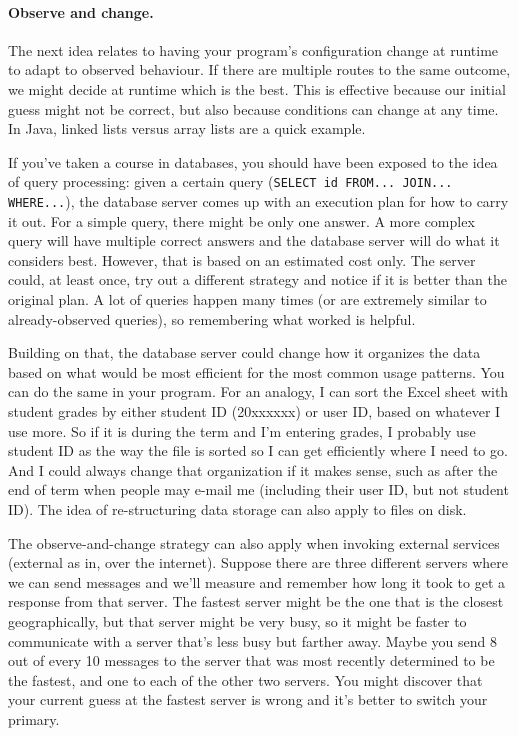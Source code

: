 \documentclass[a4paper]{report}
\begin{document}
\paragraph{Observe and change.}
The next idea relates to having your program's configuration change at runtime to adapt to observed behaviour. If there are multiple routes to the same outcome, we might decide at runtime which is the best. This is effective because our initial guess might not be correct, but also because conditions can change at any time. In Java, linked lists versus array lists are a quick example.

If you've taken a course in databases, you should have been exposed to the idea of query processing: given a certain query (\texttt{SELECT id FROM... JOIN... WHERE...}), the database server comes up with an execution plan for how to carry it out. For a simple query, there might be only one answer. A more complex query will have multiple correct answers and the database server will do what it considers best. However, that is based on an estimated cost only. The server could, at least once, try out a different strategy and notice if it is better than the original plan. A lot of queries happen many times (or are extremely similar to already-observed queries), so remembering what worked is helpful.

Building on that, the database server could change how it organizes the data based on what would be most efficient for the most common usage patterns. You can do the same in your program. For an analogy, I can sort the Excel sheet with student grades by either student ID (20xxxxxx) or user ID, based on whatever I use more. So if it is during the term and I'm entering grades, I probably use student ID as the way the file is sorted so I can get efficiently where I need to go. And I could always change that organization if it makes sense, such as after the end of term when people may e-mail me (including their user ID, but not student ID). The idea of re-structuring data storage can also apply to files on disk.

The observe-and-change strategy can also apply when invoking external services (external as in, over the internet). Suppose there are three different servers where we can send messages and we'll measure and remember how long it took to get a response from that server. The fastest server might be the one that is the closest geographically, but that server might be very busy, so it might be faster to communicate with a server that's less busy but farther away. Maybe you send 8 out of every 10 messages to the server that was most recently determined to be the fastest, and one to each of the other two servers. You might discover that your current guess at the fastest server is wrong and it's better to switch your primary.
\end{document}
